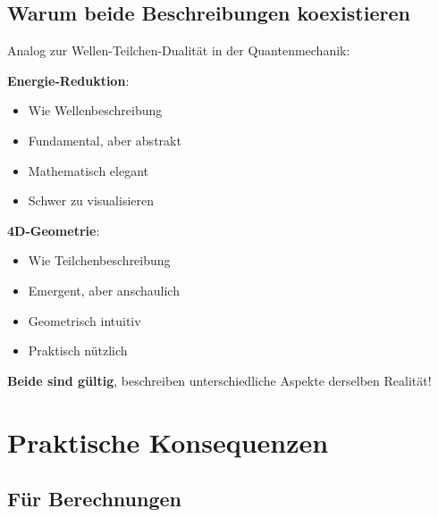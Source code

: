 \subsection{Warum beide Beschreibungen koexistieren}

\begin{philosophical}[Komplementarität]
Analog zur Wellen-Teilchen-Dualität in der Quantenmechanik:

\textbf{Energie-Reduktion}:
\begin{itemize}
\item Wie Wellenbeschreibung
\item Fundamental, aber abstrakt
\item Mathematisch elegant
\item Schwer zu visualisieren
\end{itemize}

\textbf{4D-Geometrie}:
\begin{itemize}
\item Wie Teilchenbeschreibung
\item Emergent, aber anschaulich
\item Geometrisch intuitiv
\item Praktisch nützlich
\end{itemize}

\vspace{0.3cm}

\textbf{Beide sind gültig}, beschreiben unterschiedliche Aspekte derselben Realität!
\end{philosophical}

\section{Praktische Konsequenzen}

\subsection{Für Berechnungen}

